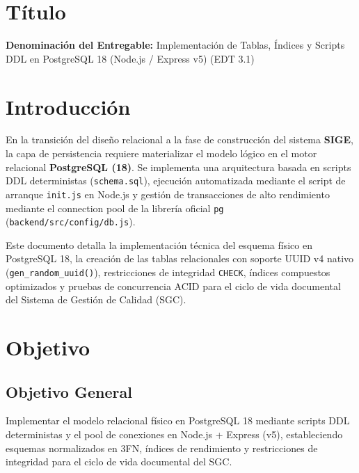 \documentclass[11pt,a4paper]{article}
\begin{document}

\vspace{0.25cm}
\section{Título}
\textbf{Denominación del Entregable:} Implementación de Tablas, Índices y Scripts DDL en PostgreSQL 18 (Node.js / Express v5) (EDT 3.1)



\section{Introducción}
En la transición del diseño relacional a la fase de construcción del sistema \textbf{SIGE}, la capa de persistencia requiere materializar el modelo lógico en el motor relacional \textbf{PostgreSQL (18)}. Se implementa una arquitectura basada en scripts DDL deterministas (\texttt{schema.sql}), ejecución automatizada mediante el script de arranque \texttt{init.js} en Node.js y gestión de transacciones de alto rendimiento mediante el connection pool de la librería oficial \texttt{pg} (\texttt{backend/src/config/db.js}).

Este documento detalla la implementación técnica del esquema físico en PostgreSQL 18, la creación de las tablas relacionales con soporte UUID v4 nativo (\texttt{gen\_random\_uuid()}), restricciones de integridad \texttt{CHECK}, índices compuestos optimizados y pruebas de concurrencia ACID para el ciclo de vida documental del Sistema de Gestión de Calidad (SGC).

\section{Objetivo}

\subsection{Objetivo General}
Implementar el modelo relacional físico en PostgreSQL 18 mediante scripts DDL deterministas y el pool de conexiones en Node.js + Express (v5), estableciendo esquemas normalizados en 3FN, índices de rendimiento y restricciones de integridad para el ciclo de vida documental del SGC.
\end{document}
